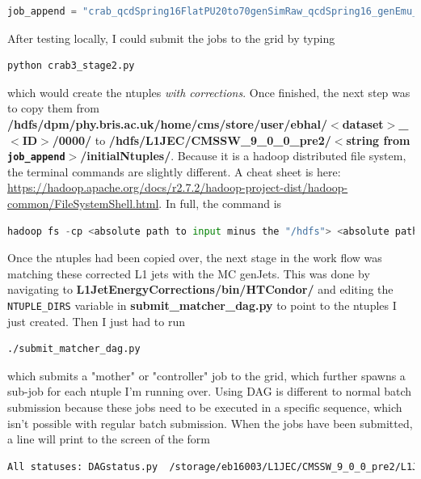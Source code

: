 \begin{lstlisting}[belowskip=-0.7cm, language=python, numbers=none]
job_append = "crab_qcdSpring16FlatPU20to70genSimRaw_qcdSpring16_genEmu_21Feb2017_902pre2v91p16_withJEC_6e31c000a39c3"
\end{lstlisting}

After testing locally, I could submit the jobs to the grid by typing

\begin{lstlisting}[belowskip=-0.7cm, language=sh, numbers=none]
python crab3_stage2.py
\end{lstlisting}

which would create the ntuples \emph{with corrections}. Once finished, the next step was to copy them from \textbf{/hdfs/dpm/phy.bris.ac.uk/home/cms/store/user/ebhal/$<$dataset$>$\_$<$ID$>$/0000/} to \textbf{/hdfs/L1JEC/CMSSW\_9\_0\_0\_pre2/$<$string from \texttt{job\_append}$>$/initialNtuples/}. Because it is a hadoop distributed file system, the terminal commands are slightly different. A cheat sheet is here: \url{https://hadoop.apache.org/docs/r2.7.2/hadoop-project-dist/hadoop-common/FileSystemShell.html}. In full, the command is

\begin{lstlisting}[belowskip=-0.7cm, language=python, numbers=none]
hadoop fs -cp <absolute path to input minus the "/hdfs"> <absolute path to output minus the "/hdfs">
\end{lstlisting}

Once the ntuples had been copied over, the next stage in the work flow was matching these corrected L1 jets with the MC genJets. This was done by navigating to \textbf{L1JetEnergyCorrections/bin/HTCondor/} and editing the \texttt{NTUPLE\_DIRS} variable in \textbf{submit\_matcher\_dag.py} to point to the ntuples I just created. Then I just had to run

\begin{lstlisting}[belowskip=-0.7cm, language=sh, numbers=none]
./submit_matcher_dag.py
\end{lstlisting}

which submits a "mother" or "controller" job to the grid, which further spawns a sub-job for each ntuple I'm running over. Using DAG is different to normal batch submission because these jobs need to be executed in a specific sequence, which isn't possible with regular batch submission. When the jobs have been submitted, a line will print to the screen of the form

\begin{lstlisting}[belowskip=-0.7cm, language=sh, numbers=none]
All statuses: DAGstatus.py  /storage/eb16003/L1JEC/CMSSW_9_0_0_pre2/L1JetEnergyCorrections/jobs/pairs/<date>/matcher_102253_pCB.status
\end{lstlisting}

